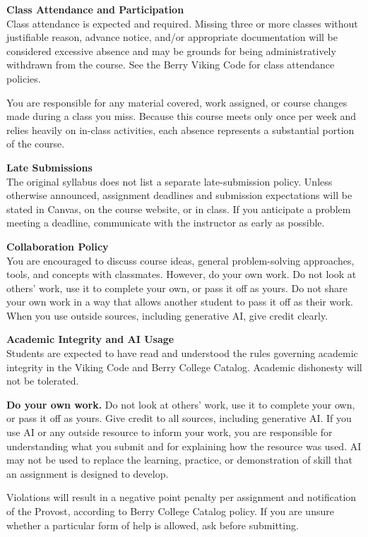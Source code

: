 \documentclass[11pt,letterpaper]{article}
\newcommand{\lefthead}[2]{\noindent\textbf{#1}\hfill\\[#2]}
\newcommand{\blankline}{\par\vspace{0.3cm}}
\begin{document}
\lefthead{Class Attendance and Participation}{0.3cm}
Class attendance is expected and required. Missing three or more classes without justifiable reason, advance notice, and/or appropriate documentation will be considered excessive absence and may be grounds for being administratively withdrawn from the course. See the Berry Viking Code for class attendance policies.
\blankline

You are responsible for any material covered, work assigned, or course changes made during a class you miss. Because this course meets only once per week and relies heavily on in-class activities, each absence represents a substantial portion of the course.
\blankline

\lefthead{Late Submissions}{0.3cm}
The original syllabus does not list a separate late-submission policy. Unless otherwise announced, assignment deadlines and submission expectations will be stated in Canvas, on the course website, or in class. If you anticipate a problem meeting a deadline, communicate with the instructor as early as possible.
\blankline

\lefthead{Collaboration Policy}{0.3cm}
You are encouraged to discuss course ideas, general problem-solving approaches, tools, and concepts with classmates. However, do your own work. Do not look at others' work, use it to complete your own, or pass it off as yours. Do not share your own work in a way that allows another student to pass it off as their work. When you use outside sources, including generative AI, give credit clearly.
\blankline

\newpage
\lefthead{Academic Integrity and AI Usage}{0.3cm}
Students are expected to have read and understood the rules governing academic integrity in the Viking Code and Berry College Catalog. Academic dishonesty will not be tolerated.
\blankline

\textbf{Do your own work.} Do not look at others' work, use it to complete your own, or pass it off as yours. Give credit to all sources, including generative AI. If you use AI or any outside resource to inform your work, you are responsible for understanding what you submit and for explaining how the resource was used. AI may not be used to replace the learning, practice, or demonstration of skill that an assignment is designed to develop.
\blankline

Violations will result in a negative point penalty per assignment and notification of the Provost, according to Berry College Catalog policy. If you are unsure whether a particular form of help is allowed, ask before submitting.
\blankline
\end{document}
